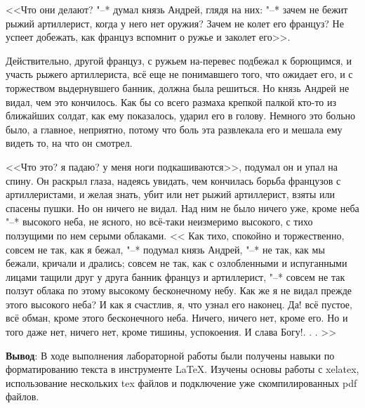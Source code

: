 \documentclass[a4paper,14pt]{article}
\begin{document}
{    \par <<Что они делают? "--* думал князь Андрей, глядя на них: "--* зачем не бежит рыжий артиллерист, когда у него нет оружия? Зачем не колет его француз? Не успеет добежать, как француз вспомнит о ружье и заколет его>>.
    \par Действительно, другой француз, с ружьем на-перевес подбежал к борющимся, и участь рыжего артиллериста, всё еще не понимавшего того, что ожидает его, и с торжеством выдернувшего банник, должна была решиться. Но князь Андрей не видал, чем это кончилось. Как бы со всего размаха крепкой палкой кто-то из ближайших солдат, как ему показалось, ударил его в голову. Немного это больно было, а главное, неприятно, потому что боль эта развлекала его и мешала ему видеть то, на что он смотрел.
    \par <<Что это? я падаю? у меня ноги подкашиваются>>, подумал он и упал на спину. Он раскрыл глаза, надеясь увидать, чем кончилась борьба французов с артиллеристами, и желая знать, убит или нет рыжий артиллерист, взяты или спасены пушки. Но он ничего не видал. Над ним не было ничего уже, кроме неба "--* высокого неба, не ясного, но всё-таки неизмеримо высокого, с тихо ползущими по нем серыми облаками. << Как тихо, спокойно и торжественно, совсем не так, как я бежал, "--* подумал князь Андрей, "--* не так, как мы бежали, кричали и дрались; совсем не так, как с озлобленными и испуганными лицами тащили друг у друга банник француз и артиллерист, "--* совсем не так ползут облака по этому высокому бесконечному небу. Как же я не видал прежде этого высокого неба? И как я счастлив, я, что узнал его наконец. Да! всё пустое, всё обман, кроме этого бесконечного неба. Ничего, ничего нет, кроме его.
    Но и того даже нет, ничего нет, кроме тишины, успокоения. И слава Богу!. . . >>
}
\bigskip
\texttt{}
\bigskip
\large{
    \par \textbf{Вывод}: В ходе выполнения лабораторной работы были получены навыки по форматированию текста в инструменте \LaTeX. Изучены основы работы с xelatex, использование нескольких tex файлов и подключение уже скомпилированных pdf файлов.
}
\end{document}
